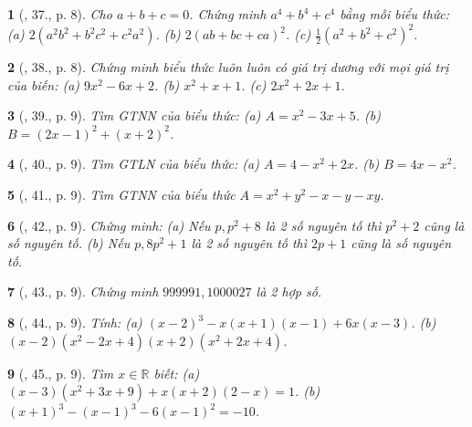 \documentclass{article}
\newtheorem{baitoan}{}
\begin{document}
\begin{baitoan}[\cite{Binh_Toan_8_tap_1}, 37., p. 8]
	Cho $a + b + c = 0$. Chứng minh $a^4 + b^4 + c^4$ bằng mỗi biểu thức: (a) $2(a^2b^2 + b^2c^2 + c^2a^2)$. (b) $2(ab + bc + ca)^2$. (c) $\frac{1}{2}(a^2 + b^2 + c^2)^2$.
\end{baitoan}

\begin{baitoan}[\cite{Binh_Toan_8_tap_1}, 38., p. 8]
	Chứng minh biểu thức luôn luôn có giá trị dương với mọi giá trị của biến: (a) $9x^2 - 6x + 2$. (b) $x^2 + x + 1$. (c) $2x^2 + 2x + 1$.
\end{baitoan}

\begin{baitoan}[\cite{Binh_Toan_8_tap_1}, 39., p. 9]
	Tìm {\rm GTNN} của biểu thức: (a) $A = x^2 - 3x + 5$. (b) $B = (2x - 1)^2 + (x + 2)^2$.
\end{baitoan}

\begin{baitoan}[\cite{Binh_Toan_8_tap_1}, 40., p. 9]
	Tìm {\rm GTLN} của biểu thức: (a) $A = 4 - x^2 + 2x$. (b) $B = 4x - x^2$.
\end{baitoan}

\begin{baitoan}[\cite{Binh_Toan_8_tap_1}, 41., p. 9]
	Tìm {\rm GTNN} của biểu thức $A = x^2 + y^2 - x - y - xy$.
\end{baitoan}

\begin{baitoan}[\cite{Binh_Toan_8_tap_1}, 42., p. 9]
	Chứng minh: (a) Nếu $p,p^2 + 8$ là 2 số nguyên tố thì $p^2 + 2$ cũng là số nguyên tố. (b) Nếu $p,8p^2 + 1$ là 2 số nguyên tố thì $2p + 1$ cũng là số nguyên tố.
\end{baitoan}

\begin{baitoan}[\cite{Binh_Toan_8_tap_1}, 43., p. 9]
	Chứng minh $999991,1000027$ là 2 hợp số.
\end{baitoan}

\begin{baitoan}[\cite{Binh_Toan_8_tap_1}, 44., p. 9]
	Tính: (a) $(x - 2)^3 - x(x + 1)(x - 1) + 6x(x - 3)$. (b) $(x - 2)(x^2 - 2x + 4)(x + 2)(x^2 + 2x + 4)$.
\end{baitoan}

\begin{baitoan}[\cite{Binh_Toan_8_tap_1}, 45., p. 9]
	Tìm $x\in\mathbb{R}$ biết: (a) $(x - 3)(x^2 + 3x + 9) + x(x + 2)(2 - x) = 1$. (b) $(x + 1)^3 - (x - 1)^3 - 6(x - 1)^2 = -10$.
\end{baitoan}
\end{document}
